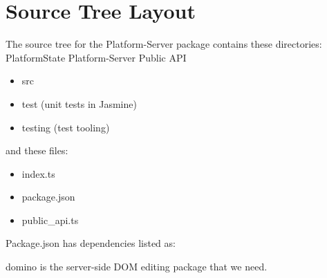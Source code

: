 \section{Source Tree Layout}

The source tree for the Platform-Server package contains these directories:
PlatformState
Platform-Server Public API

\begin{itemize}
  \item src
  \item test (unit tests in Jasmine)
  \item testing (test tooling)
\end{itemize}

and these files:

\begin{itemize}
  \item index.ts
  \item package.json
  \item public\_api.ts
\end{itemize}

Package.json has dependencies listed as:



domino is the server-side DOM editing package that we need.
